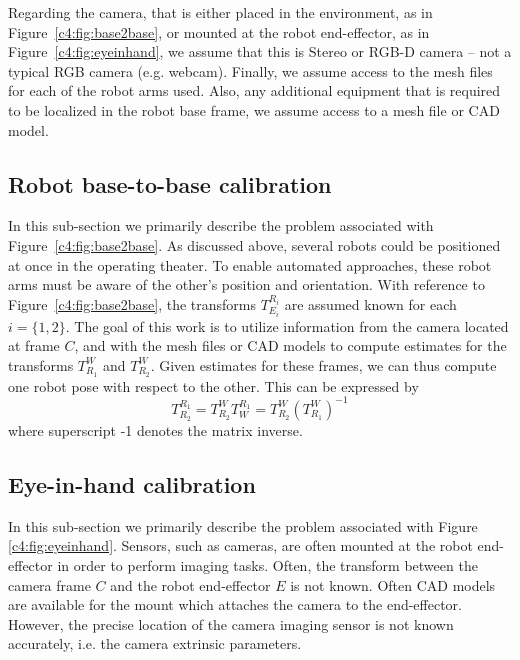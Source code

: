 Regarding the camera, that is either placed in the environment, as in Figure~\ref{c4:fig:base2base}, or mounted at the robot end-effector, as in Figure~\ref{c4:fig:eyeinhand}, we assume that this is Stereo or RGB-D camera -- not a typical RGB camera (e.g. webcam).
Finally, we assume access to the mesh files for each of the robot arms used.
Also, any additional equipment that is required to be localized in the robot base frame, we assume access to a mesh file or CAD model.

\subsection{Robot base-to-base calibration}

In this sub-section we primarily describe the problem associated with Figure~\ref{c4:fig:base2base}.
As discussed above, several robots could be positioned at once in the operating theater.
To enable automated approaches, these robot arms must be aware of the other's position and orientation.
With reference to Figure~\ref{c4:fig:base2base}, the transforms $T^{R_i}_{E_i}$ are assumed known for each $i=\{1, 2\}$.
The goal of this work is to utilize information from the camera located at frame $C$, and with the mesh files or CAD models to compute estimates for the transforms $T^W_{R_1}$ and $T^W_{R_2}$.
Given estimates for these frames, we can thus compute one robot pose with respect to the other.
This can be expressed by
\[
T^{R_1}_{R_2} = T^W_{R_2} T^{R_1}_W = T^W_{R_2} (T^W_{R_1})^{-1}
\]
where superscript -1 denotes the matrix inverse. 

\subsection{Eye-in-hand calibration}

In this sub-section we primarily describe the problem associated with Figure \ref{c4:fig:eyeinhand}.
Sensors, such as cameras, are often mounted at the robot end-effector in order to perform imaging tasks.
Often, the transform between the camera frame $C$ and the robot end-effector $E$ is not known.
Often CAD models are available for the mount which attaches the camera to the end-effector.
However, the precise location of the camera imaging sensor is not known accurately, i.e. the camera extrinsic parameters.

